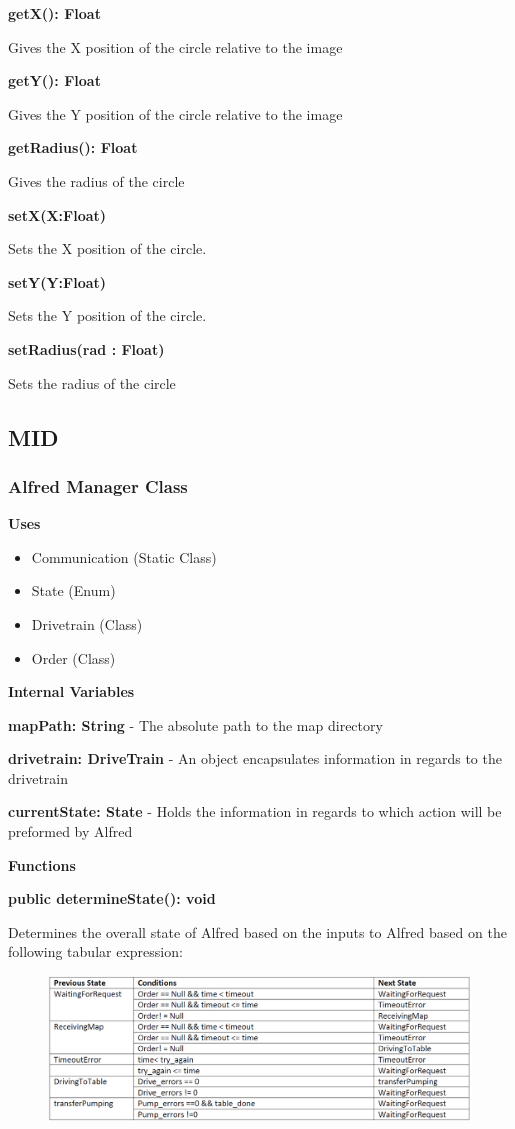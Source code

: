 \documentclass [10pt]{article}
\begin{document}
\textbf{getX(): Float}

Gives the X position of the circle relative to the image

\textbf{getY(): Float}

Gives the Y position of the circle relative to the image

\textbf{getRadius(): Float}

Gives the radius of the circle

\textbf{setX(X:Float)}

Sets the X position of the circle.

\textbf{setY(Y:Float)}

Sets the Y position of the circle.

\textbf{setRadius(rad : Float)}

Sets the radius of the circle

\subsection{MID}

\subsubsection{Alfred Manager Class}

\textbf{Uses}
\begin{itemize}
	\item Communication (Static Class)
	\item State (Enum)
	\item Drivetrain (Class)
	\item Order (Class)
\end{itemize}


\textbf{Internal Variables}

\textbf{mapPath: String} - The absolute path to the map directory

\textbf{drivetrain: DriveTrain} - An object encapsulates information in regards to the drivetrain

\textbf{currentState: State} - Holds the information in regards to which action will be preformed by Alfred


\textbf{Functions}

\textbf{public determineState(): void}

Determines the overall state of Alfred based on the inputs to Alfred based on the following tabular expression:
\begin{figure} [h!]
	\centering
	\includegraphics [scale = 0.4] {figures/AlfredSystem_DetermineState.png}
\end{figure}
\end{document}
